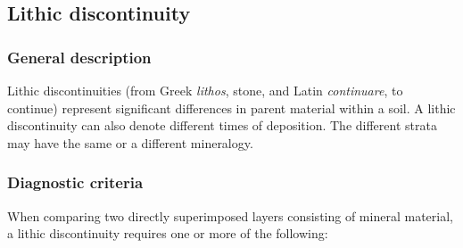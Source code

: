 \documentclass[
  letterpaper,
  DIV=11,
  numbers=noendperiod]{scrreprt}
\begin{document}
\hypertarget{lithic-discontinuity}{%
\subsection{Lithic discontinuity}\label{lithic-discontinuity}}

\hypertarget{general-description-45}{%
\subsubsection{General description}\label{general-description-45}}

Lithic discontinuities (from Greek \emph{lithos}, stone, and Latin
\emph{continuare}, to continue) represent significant differences in
parent material within a soil. A lithic discontinuity can also denote
different times of deposition. The different strata may have the same or
a different mineralogy.

\hypertarget{diagnostic-criteria-46}{%
\subsubsection{Diagnostic criteria}\label{diagnostic-criteria-46}}

When comparing two directly superimposed layers consisting of mineral
material, a lithic discontinuity requires one or more of the following:
\end{document}
